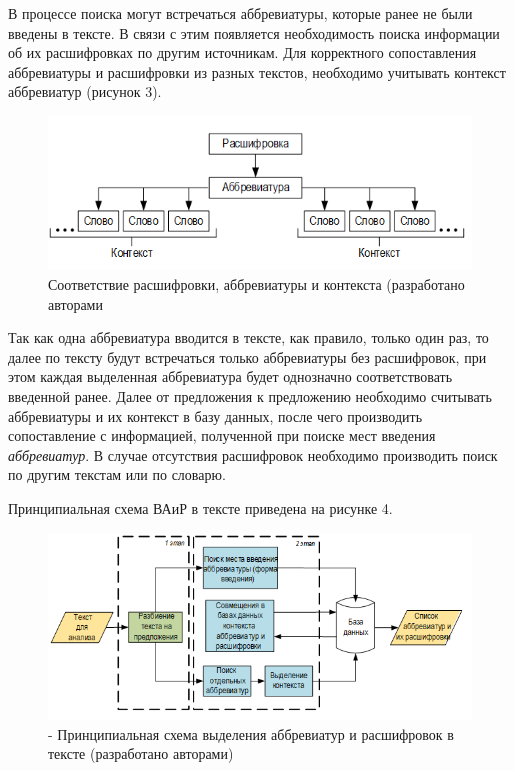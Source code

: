 \documentclass[a4paper]{article}
\begin{document}
В процессе поиска могут встречаться аббревиатуры, которые ранее не были введены в тексте. В связи с этим появляется необходимость поиска информации об их расшифровках по другим источникам. Для корректного сопоставления аббревиатуры и расшифровки из разных текстов, необходимо учитывать контекст аббревиатур (рисунок 3). \\
\begin{figure}[!h]
\centering
\includegraphics[scale=0.8]{rash.PNG}
\caption{Соответствие расшифровки, аббревиатуры и контекста (разработано авторами}
\label{claster_pic1}
\end{figure}

Так как одна аббревиатура вводится в тексте, как правило, только один раз, то далее по тексту будут встречаться только аббревиатуры без расшифровок, при этом каждая выделенная аббревиатура будет однозначно соответствовать введенной ранее. Далее от предложения к предложению необходимо считывать аббревиатуры и их контекст в базу данных, после чего производить сопоставление с информацией, полученной при поиске мест введения \textit{аббревиатур}. В случае отсутствия расшифровок необходимо производить поиск по другим текстам или по словарю.

Принципиальная схема ВАиР в тексте приведена на рисунке 4.\\
\begin{figure}[!h]
\centering
\includegraphics[scale=0.8]{prin.png}
\caption{- Принципиальная схема выделения аббревиатур и
расшифровок в тексте (разработано авторами)}
\label{claster_pic1}
\end{figure}
\end{document}

